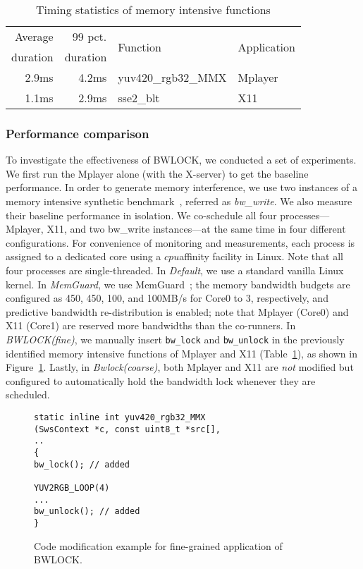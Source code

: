\documentclass[times, 10pt,onecolumn]{article}
\newcommand{\bottomrule}{\hline}
\newcommand{\toprule}{\hline}
\newcommand{\midrule}{\hline}
\begin{document}
\begin{table}[htbp]
\centering
\begin{tabular}{rrll}
\toprule
Average & 99 pct. & \multirow{2}[0]{*}{Function} & \multirow{2}[0]{*}{Application} \\
duration & duration & & \\
\midrule
2.9ms & 4.2ms & yuv420\_rgb32\_MMX & Mplayer \\
1.1ms & 2.9ms & sse2\_blt & X11 \\
\bottomrule
\end{tabular}\caption{Timing statistics of memory intensive functions}
\label{tbl:functions-time}\end{table}





\subsubsection{Performance comparison}
To investigate the effectiveness of BWLOCK, we conducted a set of
experiments. We first run the Mplayer alone (with the
X-server) to get the baseline performance. In order to generate memory
interference, we use two instances of a memory intensive synthetic
benchmark~\cite{yun2013rtas}, referred as \emph{bw\_write}. We also
measure their baseline performance in isolation. We co-schedule all
four processes---Mplayer, X11, and two bw\_write instances---at the
same time in four different configurations.
For convenience of monitoring and measurements, each process is
assigned to a dedicated core using a $cpu$affinity facility in
Linux. Note that all four processes are single-threaded.
In \emph{Default}, we use a standard vanilla Linux kernel. In
\emph{MemGuard}, we use MemGuard~\cite{yun2013rtas}; the memory bandwidth
budgets are configured as 450, 450, 100, and 100MB/s for Core0 to 3,
respectively, and predictive bandwidth re-distribution is enabled;
note that Mplayer (Core0) and X11 (Core1) are reserved more bandwidths
than the co-runners. In \emph{BWLOCK(fine)}, we manually insert
\texttt{bw\_lock} and \texttt{bw\_unlock} in the previously identified
memory intensive functions of Mplayer and X11 (Table~\ref{tbl:functions-time}), as shown in
Figure~\ref{fig:bwlock-example}. Lastly, in \emph{Bwlock(coarse)},
both Mplayer and X11 are \emph{not} modified but configured to automatically
hold the bandwidth lock whenever they are scheduled.

\begin{figure}
\begin{lstlisting}
static inline int yuv420_rgb32_MMX
(SwsContext *c, const uint8_t *src[],
..
{
bw_lock(); // added

YUV2RGB_LOOP(4)
...
bw_unlock(); // added
}
\end{lstlisting}
\caption{Code modification example for fine-grained application of BWLOCK. }
\label{fig:bwlock-example}
\end{figure}
\end{document}
